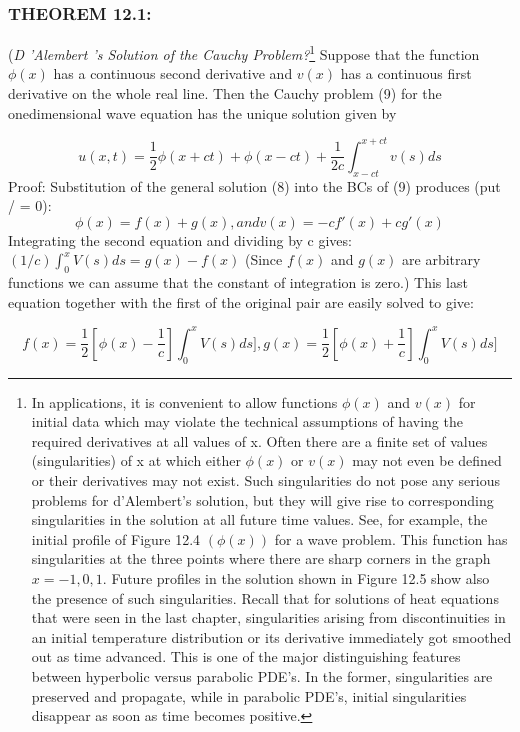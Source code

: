 \documentclass[../main.tex]{subfiles}
\begin{document}
\subsubsection{THEOREM 12.1:}
(\emph{D 'Alembert 's Solution of the Cauchy Problem?}\footnote
{ In applications, it is convenient to allow functions $\phi(x)$ and $v(x)$ for initial data which may violate
the technical assumptions of having the required derivatives at all values of x. Often there are a finite
set of values (singularities) of x at which either $\phi(x)$ or $v(x)$ may not even be defined or their
derivatives may not exist. Such singularities do not pose any serious problems for d'Alembert's
solution, but they will give rise to corresponding singularities in the solution at all future time values.
See, for example, the initial profile of Figure 12.4 $(\phi(x))$ for a wave problem.  This function has
singularities at the three points where there are sharp corners in the graph $x = -1 , 0, 1$. Future profiles
in the solution shown in Figure 12.5 show also the presence of such singularities. Recall that for
solutions of heat equations that were seen in the last chapter, singularities arising from discontinuities
in an initial temperature distribution or its derivative immediately got smoothed out as time advanced.
This is one of the major distinguishing features between hyperbolic versus parabolic PDE's. In the
former, singularities are preserved and propagate, while in parabolic PDE's, initial singularities
disappear as soon as time becomes positive.} 
Suppose that
the function $\phi(x)$ has a continuous second derivative and $v(x)$ has a continuous
first derivative on the whole real line. Then the Cauchy problem (9) for the onedimensional wave equation has the unique solution given by 

\begin{equation}
u(x,t)=\dfrac{1}{2} \phi(x+ct)+\phi(x-ct)+\dfrac{1}{2c} \int_{x-ct}^{x+ct} v(s)ds
\end{equation}
Proof: Substitution of the general solution (8) into the BCs of (9) produces (put /
= 0): 
$$\phi(x)=f(x)+g(x), and v(x)=-cf'(x)+cg'(x)$$
Integrating the second equation and dividing by c gives:$(1/c) \int_{0}^{x} V(s)ds=g(x)-f(x)$
(Since $f(x)$ and $g(x)$ are arbitrary functions we can assume that the
constant of integration is zero.) This last equation together with the first of the
original pair are easily solved to give:

$$f(x)=\dfrac{1}{2}[\phi(x)-\dfrac{1}{c}] \int_{0}^{x} V(s)ds] , g(x)=\dfrac{1}{2}[\phi(x)+\dfrac{1}{c}] \int_{0}^{x} V(s)ds]$$
\end{document}
